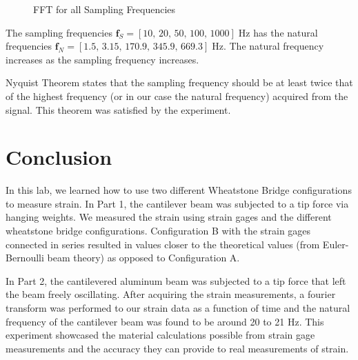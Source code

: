 \documentclass{article}
\begin{document}
\begin{figure}[H]
\begin{minipage}{.5\textwidth}
      \caption{FFT for all Sampling Frequencies}
      \label{fig:fft1000hz}
    \end{minipage}
    \label{fig:ffts}
\end{figure}
    
The sampling frequencies \(\textbf{f}_{S} = \left[10,\, 20,\, 50,\, 100,\, 1000\right]\; \text{Hz}\) has the natural frequencies \(\textbf{f}_{N} = \left[1.5,\, 3.15,\, 170.9,\, 345.9,\, 669.3\right]\; \text{Hz}\).  The natural frequency increases as the sampling frequency increases.
\vspace{1.5mm}

Nyquist Theorem states that the sampling frequency should be at least twice that of the highest frequency (or in our case the natural frequency) acquired from the signal. This theorem was satisfied by the experiment.

\section{Conclusion}
In this lab, we learned how to use two different Wheatstone Bridge configurations to measure strain. In Part 1, the cantilever beam was subjected to a tip force via hanging weights. We measured the strain using strain gages and the different wheatstone bridge configurations. Configuration B with the strain gages connected in series resulted in values closer to the theoretical values (from Euler-Bernoulli beam theory) as opposed to Configuration A. 
\vspace{2.5mm}

In Part 2, the cantilevered aluminum beam was subjected to a tip force that left the beam freely oscillating. After acquiring the strain measurements, a fourier transform was performed to our strain data as a function of time and the natural frequency of the cantilever beam was found to be around 20 to 21 Hz. This experiment showcased the material calculations possible from strain gage measurements and the accuracy they can provide to real measurements of strain.


\end{document}
